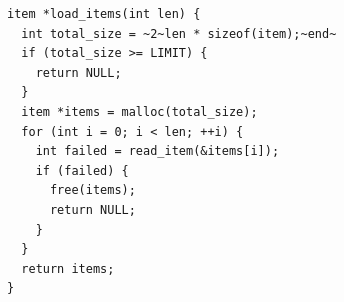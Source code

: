 \documentclass[tikz]{standalone}
\begin{document}
\begin{lrbox}{\overExampleACode}
\begin{lstlisting}
item *load_items(int len) {
  int total_size = ~2~len * sizeof(item);~end~
  if (total_size >= LIMIT) {
    return NULL;
  }
  item *items = malloc(total_size);
  for (int i = 0; i < len; ++i) {
    int failed = read_item(&items[i]);
    if (failed) {
      free(items);
      return NULL;
    }
  }
  return items;
}
\end{lstlisting}
\end{lrbox}


\end{document}
